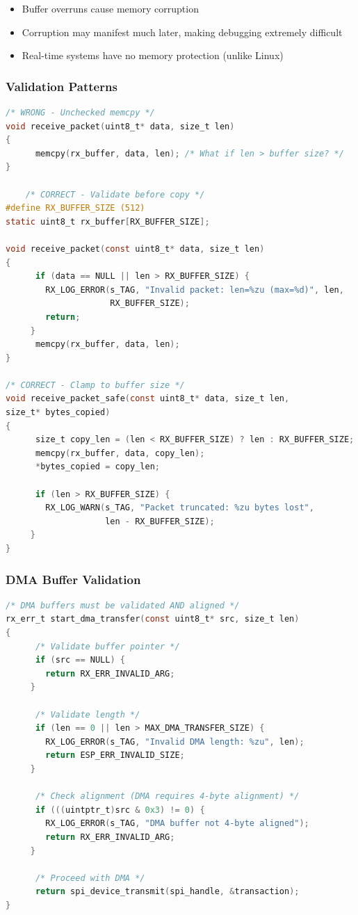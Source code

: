 \begin{itemize}
\item Buffer overruns cause memory corruption
\item Corruption may manifest much later, making debugging extremely difficult
\item Real-time systems have no memory protection (unlike Linux)
\end{itemize}

\subsubsection{Validation Patterns}

\begin{lstlisting}[language=C]
/* WRONG - Unchecked memcpy */
void receive_packet(uint8_t* data, size_t len)
{
      memcpy(rx_buffer, data, len); /* What if len > buffer size? */
}

    /* CORRECT - Validate before copy */
#define RX_BUFFER_SIZE (512)
static uint8_t rx_buffer[RX_BUFFER_SIZE];

void receive_packet(const uint8_t* data, size_t len)
{
      if (data == NULL || len > RX_BUFFER_SIZE) {
        RX_LOG_ERROR(s_TAG, "Invalid packet: len=%zu (max=%d)", len,
                     RX_BUFFER_SIZE);
        return;
     }
      memcpy(rx_buffer, data, len);
}

/* CORRECT - Clamp to buffer size */
void receive_packet_safe(const uint8_t* data, size_t len,
size_t* bytes_copied)
{
      size_t copy_len = (len < RX_BUFFER_SIZE) ? len : RX_BUFFER_SIZE;
      memcpy(rx_buffer, data, copy_len);
      *bytes_copied = copy_len;

      if (len > RX_BUFFER_SIZE) {
        RX_LOG_WARN(s_TAG, "Packet truncated: %zu bytes lost",
                    len - RX_BUFFER_SIZE);
     }
}


\end{lstlisting}
\subsubsection{DMA Buffer Validation}

\begin{lstlisting}[language=C]
/* DMA buffers must be validated AND aligned */
rx_err_t start_dma_transfer(const uint8_t* src, size_t len)
{
      /* Validate buffer pointer */
      if (src == NULL) {
        return RX_ERR_INVALID_ARG;
     }

      /* Validate length */
      if (len == 0 || len > MAX_DMA_TRANSFER_SIZE) {
        RX_LOG_ERROR(s_TAG, "Invalid DMA length: %zu", len);
        return ESP_ERR_INVALID_SIZE;
     }

      /* Check alignment (DMA requires 4-byte alignment) */
      if (((uintptr_t)src & 0x3) != 0) {
        RX_LOG_ERROR(s_TAG, "DMA buffer not 4-byte aligned");
        return RX_ERR_INVALID_ARG;
     }

      /* Proceed with DMA */
      return spi_device_transmit(spi_handle, &transaction);
}


\end{lstlisting}
